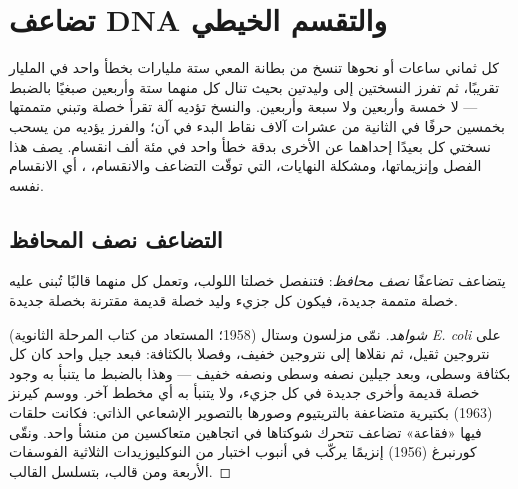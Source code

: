 \chapter{تضاعف DNA والتقسم الخيطي}\label{ch:b1:replication-mitosis}

كل ثماني ساعات أو نحوها تنسخ  من بطانة المعي ستة مليارات  بخطأ واحد في المليار تقريبًا، ثم تفرز النسختين إلى وليدتين بحيث
تنال كل منهما ستة وأربعين صبغيًا بالضبط --- لا خمسة وأربعين ولا سبعة
وأربعين. والنسخ تؤديه آلة تقرأ خصلة وتبني متممتها بخمسين حرفًا في
الثانية من عشرات آلاف نقاط البدء في آن؛ والفرز يؤديه  من
 يسحب نسختي كل  بعيدًا إحداهما عن الأخرى بدقة
خطأ واحد في مئة ألف انقسام. يصف هذا الفصل  وإنزيماتها،
ومشكلة النهايات،  التي توقّت التضاعف والانقسام، ، أي الانقسام نفسه.

\section{التضاعف نصف المحافظ}

\begin{proposition}\label{prop:b1:replication-mitosis:semiconservative}
يتضاعف  تضاعفًا \emph{نصف محافظ}: فتنفصل خصلتا اللولب، وتعمل كل
منهما قالبًا تُبنى عليه خصلة متممة جديدة، فيكون كل جزيء وليد خصلة
قديمة مقترنة بخصلة جديدة.
\end{proposition}
\begin{proof}[شواهد]
نمّى مزلسون وستال (1958؛ المستعاد من كتاب المرحلة الثانوية)
\emph{E. coli} على نتروجين ثقيل، ثم نقلاها إلى نتروجين خفيف، وفصلا
 بالكثافة: فبعد جيل واحد كان كل  بكثافة وسطى، وبعد جيلين نصفه
وسطى ونصفه خفيف --- وهذا بالضبط ما يتنبأ به وجود خصلة قديمة وأخرى
جديدة في كل جزيء، ولا يتنبأ به أي مخطط آخر. ووسم كيرنز (1963) 
بكتيرية متضاعفة بالتريتيوم وصورها بالتصوير الإشعاعي الذاتي: فكانت
حلقات فيها «فقاعة» تضاعف تتحرك شوكتاها في اتجاهين متعاكسين من منشأ
واحد. ونقّى كورنبرغ (1956) إنزيمًا يركّب  في أنبوب اختبار من
النوكليوزيدات الثلاثية الفوسفات الأربعة ومن قالب، بتسلسل القالب.
\end{proof}

